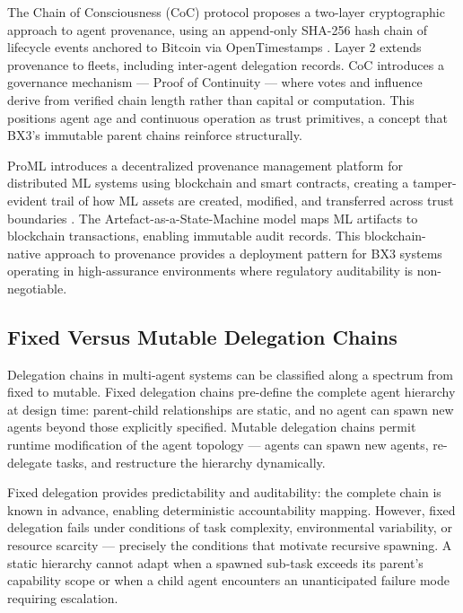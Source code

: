 The Chain of Consciousness (CoC) protocol proposes a two-layer cryptographic approach to agent provenance, using an append-only SHA-256 hash chain of lifecycle events anchored to Bitcoin via OpenTimestamps \cite{chainofconsciousness2026}. Layer 2 extends provenance to fleets, including inter-agent delegation records. CoC introduces a governance mechanism — Proof of Continuity — where votes and influence derive from verified chain length rather than capital or computation. This positions agent age and continuous operation as trust primitives, a concept that BX3's immutable parent chains reinforce structurally.

ProML introduces a decentralized provenance management platform for distributed ML systems using blockchain and smart contracts, creating a tamper-evident trail of how ML assets are created, modified, and transferred across trust boundaries \cite{proml2022}. The Artefact-as-a-State-Machine model maps ML artifacts to blockchain transactions, enabling immutable audit records. This blockchain-native approach to provenance provides a deployment pattern for BX3 systems operating in high-assurance environments where regulatory auditability is non-negotiable.

\subsection{Fixed Versus Mutable Delegation Chains}

Delegation chains in multi-agent systems can be classified along a spectrum from fixed to mutable. Fixed delegation chains pre-define the complete agent hierarchy at design time: parent-child relationships are static, and no agent can spawn new agents beyond those explicitly specified. Mutable delegation chains permit runtime modification of the agent topology — agents can spawn new agents, re-delegate tasks, and restructure the hierarchy dynamically.

Fixed delegation provides predictability and auditability: the complete chain is known in advance, enabling deterministic accountability mapping. However, fixed delegation fails under conditions of task complexity, environmental variability, or resource scarcity — precisely the conditions that motivate recursive spawning. A static hierarchy cannot adapt when a spawned sub-task exceeds its parent's capability scope or when a child agent encounters an unanticipated failure mode requiring escalation.

